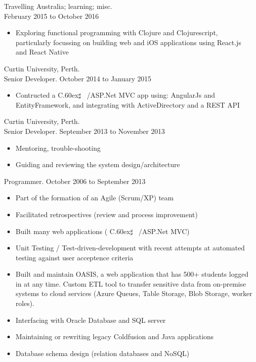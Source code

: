\documentclass[margin]{res}
\def\Csharp{%
    C\raise.60ex\hbox{$\sharp$}%
\spacefactor1000 }
\begin{document}
\begin{resume}
  Travelling Australia; learning; misc.\\
  February 2015 to October 2016
  \begin{itemize}
    \item Exploring functional programming with Clojure and Clojurescript, particularly focussing on building web and iOS applications using React.js and React Native
  \end{itemize}

  Curtin University, Perth.\\
  Senior Developer. October 2014 to January 2015
  \begin{itemize}
    \item Contructed a \Csharp\ /ASP.Net MVC app using: AngularJs and EntityFramework, and integrating with ActiveDirectory and a REST API
  \end{itemize}

  Curtin University, Perth.\\
  Senior Developer. September 2013 to November 2013
  \begin{itemize}
    \item Mentoring, trouble-shooting
    \item Guiding and reviewing the system design/architecture
  \end{itemize}
  \vspace{-0.1in}
  Programmer. October 2006 to September 2013
  \begin{itemize}
    \item Part of the formation of an Agile (Scrum/XP) team
    \item Facilitated retrospectives (review and process improvement)
    \item Built many web applications (\Csharp\ /ASP.Net MVC)
    \item Unit Testing / Test-driven-development with recent attempts at automated testing against user acceptence criteria 
    \item Built and maintain OASIS, a web application
            that has 500+ students logged in at any time. Custom ETL tool to transfer sensitive data from on-premise systems to cloud services (Azure Queues, Table Storage, Blob Storage, worker roles).
    \item Interfacing with Oracle Database and SQL server
    \item Maintaining or rewriting legacy Coldfusion and Java applications
    \item Database schema design (relation databases and NoSQL)
  \end{itemize}
  

\end{resume}
\end{document}
